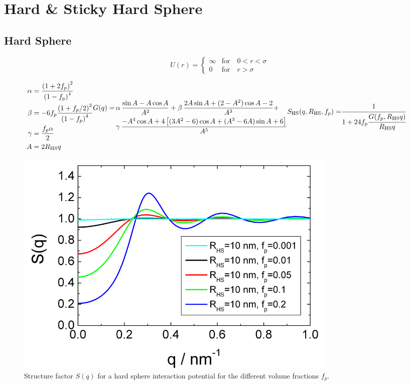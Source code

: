 \clearpage
\section{Hard \& Sticky Hard Sphere}
\subsection{Hard Sphere \cite{Percus1958,Vrij1979}
}

\begin{equation}
U(r) =
 \begin{cases}
      \infty    & \text{for} \quad 0<r<\sigma \\
      0         & \text{for} \quad r>\sigma
   \end{cases}
\end{equation}

\begin{subequations}
\begin{align}
\alpha &= \frac{\left(1+2f_p\right)^2}{\left(1-f_p\right)^4} \\
\beta  &= -6 f_p \frac{\left(1 +f_p/2 \right)^2}{\left(1-f_p\right)^4} \\
\gamma &= \frac{f_p \alpha}{2}  \\
A &= 2 R_\text{HS} q
\end{align}

\begin{align}
G(q) =  & \, \alpha \, \frac{\sin A -A \cos A }{A^2} + \beta \, \frac{2 A \sin A +(2-A^2) \cos A -2}{A^3} + \nonumber \\
    & \, \gamma  \, \frac{-A^4 \cos A + 4\left[(3A^2-6)\cos A+(A^3-6A)\sin A+6\right]}{A^5}
\end{align}
\begin{align}
S_\text{HS}(q,R_\text{HS},f_p)  = & \cfrac{1}{1+24 f_p
\cfrac{G(f_p,R_\text{HS}q)}{R_\text{HS}q}}
\end{align}
\end{subequations}


\begin{figure}[htb]
\begin{center}
\includegraphics[width=0.768\textwidth,height=0.528\textwidth]{../images/structure_factor/HardSphere/HardSphereSQ.png}
\end{center}
\caption{Structure factor $S(q)$ for a hard sphere interaction potential for the different volume fractions $f_p$.}
\label{fig:SQHardSphere}
\end{figure}


